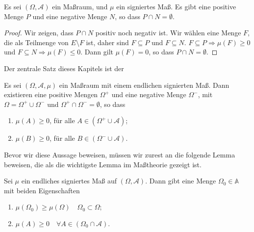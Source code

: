 \documentclass[/Users/zhangwusheng/Documents/satz von radon nikodym/satz von radon nikodym.tex]{subfiles}
\begin{document}
    \begin{mdframed}[style=mdfexample]
        \begin{lemma}\label{lem:4}
            Es sei $(\Omega, \mathcal{A})$ ein Maßraum, und $\mu$ ein signiertes Maß.
            Es gibt eine positive Menge $P$ und eine negative Menge $N$, so dass $P \cap N = \emptyset$.
        \end{lemma}
    \end{mdframed}
    \begin{proof}
        Wir zeigen, dass $P \cap N$ positiv noch negativ ist. Wir wählen eine Menge $F$, die als Teilmenge von $E \setminus F$ ist, 
        daher sind $F \subseteq P$ und $F \subseteq N$. $F \subseteq P \Longrightarrow \mu(F) \geq 0$ und $F \subseteq N \Longrightarrow \mu(F) \leq 0$. 
        Dann gilt $\mu(F) =0$, so dass $P \cap N =\emptyset$.
    \end{proof}
    Der zentrale Satz dieses Kapitels ist der
    \begin{mdframed}[style=mdfexample]
        \begin{theorem}\label{satz:1}
            Es sei $(\Omega, \mathcal{A}, \mu)$ ein Maßraum mit einem endlichen signierten Maß. Dann existieren eine positive Mengen $\Omega^{+}$ und eine negative Menge $\Omega^{-}$, 
            mit $\Omega= \Omega^{+} \cup \Omega^{-}$ und $\Omega^{+} \cap \Omega^{-} =\emptyset$, so dass 
            \begin{enumerate}[label=(\alph*)]
                \item $\mu(A) \geq 0$, für alle $A \in (\Omega^{+} \cup \mathcal{A})$;
                \item $\mu(B) \geq 0$, für alle $B \in (\Omega^{-} \cup \mathcal{A})$.
            \end{enumerate}
        \end{theorem}
    \end{mdframed}
    Bevor wir diese Aussage beweisen, müssen wir zurest an die folgende Lemma beweisen, die als die wichtigste Lemma im Maßtheorie gezeigt ist. 
    \begin{mdframed}[style=mdfexample]
        \begin{lemma}\label{lem:5}
        Sei $\mu$ ein endliches signiertes Maß auf $(\Omega, \mathcal{A})$. Dann gibt eine Menge $\Omega_0 \in \mathbb{A}$ mit beiden 
        Eigenschaften
        \begin{enumerate}[label=(\alph*)]
            \item $\mu(\Omega_0) \geq \mu(\Omega) \quad \Omega_0 \subset \Omega$;
            \item $\mu(A) \geq 0 \quad \forall A \in (\Omega_0 \cap \mathcal{A})$. 
        \end{enumerate}
        \end{lemma}
    \end{mdframed}
\end{document}
